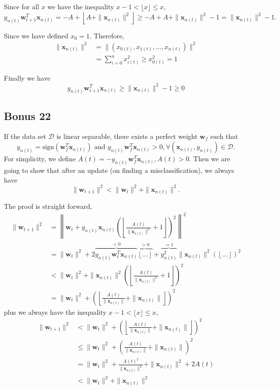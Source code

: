 Since for all $x$ we have the inequality $ x-1 < \lfloor x \rfloor \leq x$,
\[
y_{n(t)}\mathbf{w}_{t+1}^T\mathbf{x}_{n(t)}
= -A + \left\lfloor A + \|\mathbf{x}_{n(t)}\|^2 \right\rfloor
\geq -A + A + \|\mathbf{x}_{n(t)}\|^2 -1 = \|\mathbf{x}_{n(t)}\|^2 -1.
\]

Since we have defined $x_0 = 1$. Therefore, 
\begin{align*}
\|\mathbf{x}_{n(t)}\|^2
&= \|(x_{0(t)}, x_{1(t)}, \dotsc, x_{n(t)})\|^2\\
&= \sum_{i=0}^n x_{i(t)}^2 \geq x_{0(t)}^2 = 1
\end{align*}

Finally we have
\[
y_{n(t)}\mathbf{w}_{t+1}^T\mathbf{x}_{n(t)}
\geq \|\mathbf{x}_{n(t)}\|^2 -1
\geq 0
\]
\subsection*{Bonus 22}
If the data set $\mathcal{D}$ is linear separable, there exists a perfect weight $\mathbf{w}_f$ such that
\[
    y_{n(t)} = \text{sign}(\mathbf{w}_f^T\mathbf{x}_{n(t)}) \text{ and }
    y_{n(t)}\mathbf{w}_f^T\mathbf{x}_{n(t)} > 0, \forall (\mathbf{x}_{n(t)}, y_{n(t)}) \in \mathcal{D}.
\]
For simplicity, we define $A(t) = -y_{n(t)}\mathbf{w}_f^T\mathbf{x}_{n(t)}, A(t) > 0$. Then we are going to show that after an update (on finding a misclassification), we always have
\[
    \|\mathbf{w}_{t+1}\|^2 < \|\mathbf{w}_t\|^2  + \|\mathbf{x}_{n(t)}\| ^2.
\]

The proof is straight forward,
\begin{align*}
\|\mathbf{w}_{t+1}\|^2 
&= \left\|
    \mathbf{w}_t + y_{n(t)}\mathbf{x}_{n(t)}\left(\left\lfloor
        \frac{A(t)}{\|\mathbf{x}_{n(t)}\|^2} + 1
    \right\rfloor\right)^2
\right\|^2\\
&= \|\mathbf{w}_t\|^2 
    + 2\overbrace{y_{n(t)}\mathbf{w}_t^T\mathbf{x}_{n(t)}}^{< 0}\overbrace{\left\lfloor\ldots\right\rfloor}^{> 0}
    + \overbrace{y_{n(t)}^2}^{=1}\|\mathbf{x}_{n(t)}\|^2\left(\left\lfloor\ldots\right\rfloor\right)^2\\
&< \|\mathbf{w}_t\|^2
    + \|\mathbf{x}_{n(t)}\|^2\left(\left\lfloor
        \frac{A(t)}{\|\mathbf{x}_{n(t)}\|^2} + 1
    \right\rfloor\right)^2\\
&= \|\mathbf{w}_t\|^2
    + \left(\left\lfloor
        \frac{A(t)}{\|\mathbf{x}_{n(t)}\|} + \|\mathbf{x}_{n(t)}\|
    \right\rfloor\right)^2
\end{align*}
plus we always have the inequality $x-1 < \lfloor x \rfloor \leq x$,
\begin{align*}
\|\mathbf{w}_{t+1}\|^2 
&< \|\mathbf{w}_t\|^2 + \left(\left\lfloor
    \frac{A(t)}{\|\mathbf{x}_{n(t)}\|} + \|\mathbf{x}_{n(t)}\|
\right\rfloor\right)^2\\
&\leq \|\mathbf{w}_t\|^2 + \left(
    \frac{A(t)}{\|\mathbf{x}_{n(t)}\|} + \|\mathbf{x}_{n(t)}\|
\right)^2\\
&= \|\mathbf{w}_t\|^2 + \frac{A(t)^2}{\|\mathbf{x}_{n(t)}\|^2} + \|\mathbf{x}_{n(t)}\|^2 + 2A(t)\\
&< \|\mathbf{w}_t\|^2 + \|\mathbf{x}_{n(t)}\|^2
\end{align*}


